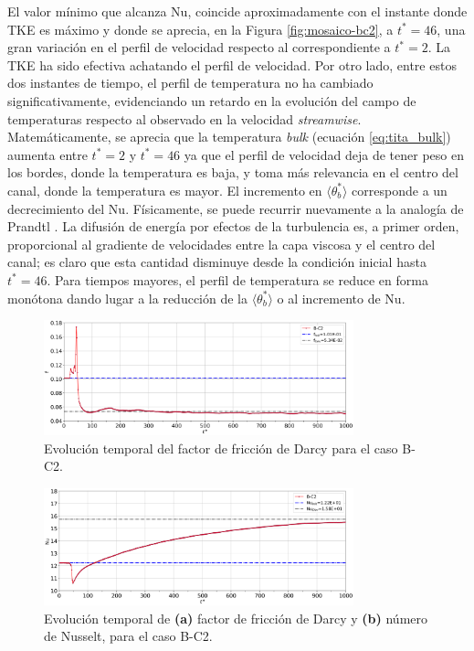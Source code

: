 El valor mínimo que alcanza Nu, coincide aproximadamente con el instante donde TKE es máximo y donde se aprecia, en la Figura \ref{fig:mosaico-bc2}, a $t^*=46$, una gran variación en el perfil de velocidad respecto al correspondiente a $t^*=2$. La TKE ha sido efectiva achatando el perfil de velocidad. Por otro lado, entre estos dos instantes de tiempo, el perfil de temperatura no ha cambiado significativamente, evidenciando un retardo en la evolución del campo de \linebreak temperaturas respecto al observado en la velocidad \textit{streamwise}. Matemáticamente, se aprecia que la temperatura \textit{bulk} (ecuación \ref{eq:tita_bulk}) aumenta entre $t^*=2$ y $t^*=46$ ya que el perfil de velocidad deja de tener peso en los bordes, donde la temperatura es baja, y toma más relevancia en el centro del canal, donde la temperatura es mayor. El incremento en $\langle \theta^*_{b} \rangle$ corresponde a un decrecimiento del Nu. Físicamente, se puede recurrir nuevamente a la analogía de Prandtl \cite{aicher1997}. La difusión de energía por efectos de la turbulencia es, a primer orden, proporcional al gradiente de velocidades entre la capa viscosa y el centro del canal; es claro que esta cantidad disminuye desde la condición inicial hasta $t^*=46$. Para tiempos mayores, el perfil de temperatura se reduce en forma monótona dando lugar a la reducción de la $\langle \theta^*_{b} \rangle$ o al incremento de Nu.



\begin{figure}[H]
  \centering  
    \includegraphics[width=0.8\textwidth]{figures/cap6/B-C2/Cases_Comp_darcy.png}
   \caption{Evolución temporal del factor de fricción de Darcy para el caso B-C2.}  
    \label{fig:darcy-bc2}
\end{figure}

\newpage

\begin{figure}[H]
  \centering  
    \includegraphics[width=0.8\textwidth]{figures/cap6/B-C2/Cases_Comp_nussel.png}
  \caption{Evolución temporal de \textbf{(a)} factor de fricción de Darcy y \textbf{(b)} número de Nusselt, para el caso B-C2.}
    \label{fig:nu-bc2}
\end{figure}

